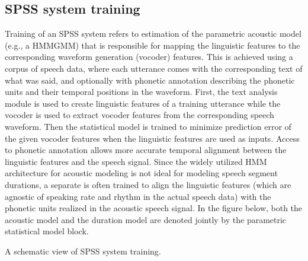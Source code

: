 \documentclass[letterpaper,10pt,english]{jupyterBook}
\begin{document}
\subsection{SPSS system training}
\label{\detokenize{Synthesis/Statistical_parametric_speech_synthesis:spss-system-training}}
\sphinxAtStartPar
Training of an SPSS system refers to estimation of the parametric
acoustic model (e.g., a HMM\sphinxhyphen{}GMM) that is responsible for mapping the
linguistic features to the corresponding waveform generation (vocoder)
features. This is achieved using a corpus of speech data, where each
utterance comes with the corresponding text of what was said, and
optionally with phonetic annotation describing the phonetic units and
their temporal positions in the waveform. First, the text analysis
module is used to create linguistic features of a training utterance
while the vocoder is used to extract vocoder features from the
corresponding speech waveform. Then the statistical model is trained to
minimize prediction error of the given vocoder features when the
linguistic features are used as inputs. Access to phonetic annotation
allows more accurate temporal alignment between the linguistic features
and the speech signal. Since the widely utilized HMM architecture for
acoustic modeling is not ideal for modeling speech segment durations, a
separate  is often trained to align the linguistic
features (which are agnostic of speaking rate and rhythm in the actual
speech data) with the phonetic units realized in the acoustic speech
signal. In the figure below, both the acoustic model and the duration
model are denoted jointly by the parametric statistical model block.

\sphinxAtStartPar
{}
 A schematic view of SPSS system training.
\end{document}
